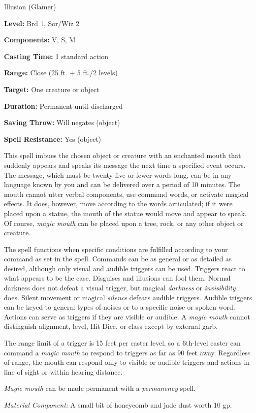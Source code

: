 
Illusion (Glamer)

\textbf{Level:} Brd 1, Sor/Wiz 2

\textbf{Components:} V, S, M

\textbf{Casting Time:} 1 standard action

\textbf{Range:} Close (25 ft. + 5 ft./2 levels)

\textbf{Target:} One creature or object

\textbf{Duration:} Permanent until discharged

\textbf{Saving Throw:} Will negates (object)

\textbf{Spell Resistance:} Yes (object)

This spell imbues the chosen object or creature with an enchanted mouth that suddenly 
appears and speaks its message the next time a specified event occurs. The message, 
which must be twenty-five or fewer words long, can be in any language known by 
you and can be delivered over a period of 10 minutes. The mouth cannot utter verbal 
components, use command words, or activate magical effects. It does, however, move 
according to the words articulated; if it were placed upon a statue, the mouth 
of the statue would move and appear to speak. Of course, \textit{magic mouth} can 
be placed upon a tree, rock, or any other object or creature.

The spell functions when specific conditions are fulfilled according to your command 
as set in the spell. Commands can be as general or as detailed as desired, although 
only visual and audible triggers can be used. Triggers react to what appears to 
be the case. Disguises and illusions can fool them. Normal darkness does not defeat 
a visual trigger, but magical \textit{darkness} or \textit{invisibility} does. 
Silent movement or magical \textit{silence} defeats audible triggers. Audible triggers 
can be keyed to general types of noises or to a specific noise or spoken word. 
Actions can serve as triggers if they are visible or audible. A \textit{magic mouth 
}cannot distinguish alignment, level, Hit Dice, or class except by external garb.

The range limit of a trigger is 15 feet per caster level, so a 6th-level caster 
can command a \textit{magic mouth} to respond to triggers as far as 90 feet away. 
Regardless of range, the mouth can respond only to visible or audible triggers 
and actions in line of sight or within hearing distance.

\textit{Magic mouth} can be made permanent with a \textit{permanency} spell.

\textit{Material Component:} A small bit of honeycomb and jade dust worth 10 gp.

